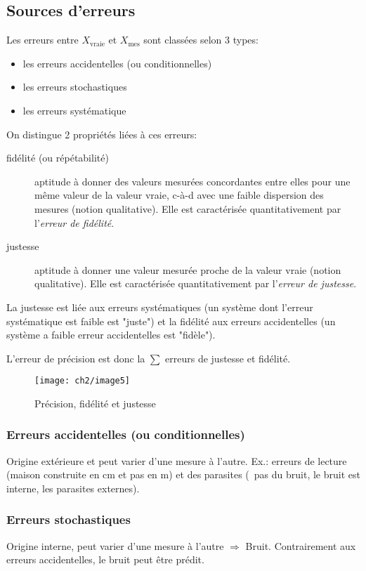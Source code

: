 \subsection{Sources d'erreurs}
Les erreurs entre \(X_{\text{vraie}}\) et \(X_{\text{mes}}\) sont classées selon 3 types:
\begin{itemize}
	\item les erreurs accidentelles (ou conditionnelles)
	\item les erreurs stochastiques
	\item les erreurs systématique
\end{itemize}
On distingue 2 propriétés liées à ces erreurs:
\begin{description}
	\item[fidélité (ou répétabilité)] aptitude à donner des valeurs mesurées concordantes entre elles pour une même valeur de la valeur vraie, c-à-d avec une faible dispersion des mesures (notion qualitative). Elle est caractérisée quantitativement par l'\emph{erreur de fidélité}. 
	\item[justesse] aptitude à donner une valeur mesurée proche de la valeur vraie (notion qualitative). Elle est caractérisée quantitativement par l'\emph{erreur de justesse}.
\end{description}
La justesse est liée aux erreurs systématiques (un système dont l'erreur systématique est faible est "juste") et la fidélité aux erreurs accidentelles (un système a faible erreur accidentelles est "fidèle").

L'erreur de précision est donc la \(\sum\) erreurs de justesse et fidélité.
\begin{figure}[H]
	\centering 
	\texttt{[image: ch2/image5]}
	\caption{Précision, fidélité et justesse}
\end{figure}
\subsubsection{Erreurs accidentelles (ou conditionnelles)}
Origine extérieure et peut varier d'une mesure à l'autre. Ex.: erreurs de lecture (maison construite en cm et pas en m) et des parasites (\danger\, pas du bruit, le bruit est interne, les parasites externes).
\subsubsection{Erreurs stochastiques}
Origine interne, peut varier d'une mesure à l'autre \(\Rightarrow\) Bruit. Contrairement aux erreurs accidentelles, le bruit peut être prédit.
